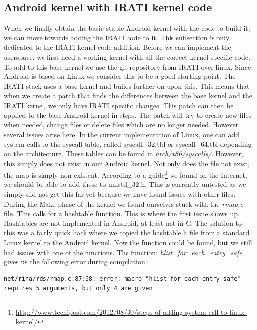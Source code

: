 \subsection{Android kernel with IRATI kernel code}

When we finally obtain the basic stable Android kernel with the code to build it, we can move towards adding the IRATI code to it. This subsection is only dedicated to the IRATI kernel code addition. Before we can implement the userspace, we first need a working kernel with all the correct kernel-specific code.
\npar
To add to this base kernel we use the git repository from IRATI over linux. Since Android is based on Linux we consider this to be a good starting point. The IRATI stack uses a base kernel and builds further on upon this. This means that when we create a patch that finds the differences between the base kernel and the IRATI kernel, we only have IRATI specific changes. This patch can then be applied to the base Android kernel in steps.
\npar
The patch will try to create new files when needed, change files or delete files which are no longer needed. However several issues arise here. In the current implementation of Linux, one can add system calls to the syscall table, called syscall\_32.tbl or syscall\_64.tbl depending on the architecture. These tables can be found in \emph{arch/x86/syscalls/}. However, this simply does not exist in our Android kernel. Not only does the file not exist, the map is simply non-existent. According to a guide\footnote{\url{http://www.techipost.com/2012/08/30/steps-of-adding-system-call-to-linux-kernel/}} we found on the Internet, we should be able to add these to unistd\_32.h. This is currently untested as we simply did not get this far yet because we have found issues with other files.
\npar
During the Make phase of the kernel we found ourselves stuck with the \emph{rmap.c} file. This calls for a hashtable function. This is where the first issue shows up. Hashtables are not implemented in Android, at least not in C. The solution to this was a fairly quick hack where we copied the hashtable.h file from a standard Linux kernel to the Android kernel. Now the function could be found, but we still had issues with one of the functions. The function: \emph{hlist\_for\_each\_entry\_safe} gives us the following error during compilation:
\\

\begin{lstlisting} 
net/rina/rds/rmap.c:87:68: error: macro "hlist_for_each_entry_safe" requires 5 arguments, but only 4 are given 
\end{lstlisting}

